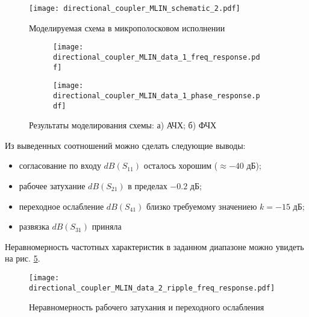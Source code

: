 \begin{figure}[!ht]
    \centering
    \texttt{[image: directional\_coupler\_MLIN\_schematic\_2.pdf]}
    \caption{Моделируемая схема в микрополосковом исполнении}
    \label{fig:directional_coupler_MLIN_schematic_2}
\end{figure}

\begin{figure}[!ht]
    \begin{subfigure}[b]{0.45\textwidth}
        \centering
        \texttt{[image: directional\_coupler\_MLIN\_data\_1\_freq\_response.pdf]}
        \caption{}
        \label{fig:directional_coupler_MLIN_data_1_freq_response}
    \end{subfigure}
    \hfill
    \begin{subfigure}[b]{0.45\textwidth}
        \centering
        \texttt{[image: directional\_coupler\_MLIN\_data\_1\_phase\_response.pdf]}
        \caption{}
        \label{fig:directional_coupler_MLIN_data_1_phase_response}
    \end{subfigure}
    \caption{Результаты моделирования схемы:
        а) АЧХ;
        б) ФЧХ
    }
    \label{fig:directional_coupler_MLIN_data_1_responses}
\end{figure}

Из выведенных соотношений можно сделать следующие выводы:
\begin{itemize}
    \item согласование по входу $dB(S_{11})$ осталось хорошим ($\approx -40 \text{~дБ}$);
    \item рабочее затухание $dB(S_{21})$ в пределах $-0.2 \text{~дБ}$;
    \item переходное ослабление $dB(S_{41})$ близко требуемому значениею $k = -15 \text{~дБ}$;
    \item развязка $dB(S_{31})$ приняла
\end{itemize}


Неравномерность частотных характеристик в заданном диапазоне можно увидеть на рис. \ref{fig:directional_coupler_MLIN_data_2_ripple_freq_response}.

\begin{figure}[!ht]
    \centering
    \texttt{[image: directional\_coupler\_MLIN\_data\_2\_ripple\_freq\_response.pdf]}
    \caption{Неравномерность рабочего затухания и переходного ослабления}
    \label{fig:directional_coupler_MLIN_data_2_ripple_freq_response}
\end{figure}

